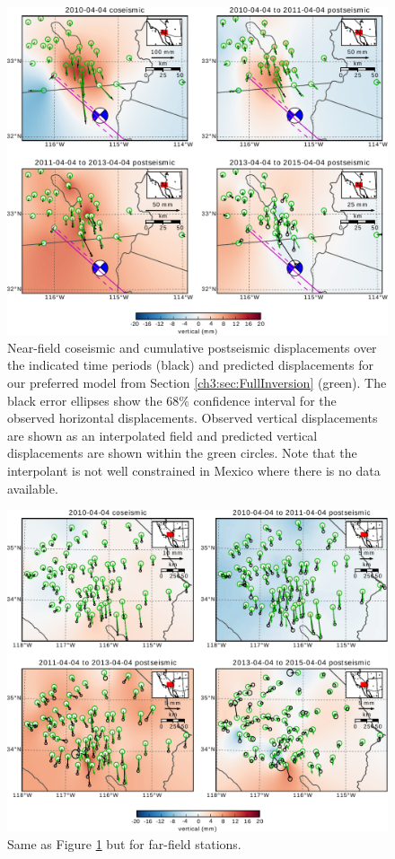 \begin{figure}\label{ch3:fig:NearField}
\includegraphics[scale=1.0]{ch3/figures/2016jb013114-p04}
\caption{Near-field coseismic and cumulative postseismic displacements over the indicated time periods (black) and predicted displacements for our preferred model from Section \ref{ch3:sec:FullInversion} (green).  The black error ellipses show the 68\% confidence interval for the observed horizontal displacements.  Observed vertical displacements are shown as an interpolated field and predicted vertical displacements are shown within the green circles.  Note that the interpolant is not well constrained in Mexico where there is no data available.}
\end{figure}

\begin{figure}\label{ch3:fig:FarField}
\includegraphics[scale=1.0]{ch3/figures/2016jb013114-p05}
\caption{Same as Figure \ref{ch3:fig:NearField} but for far-field stations.}
\end{figure}


